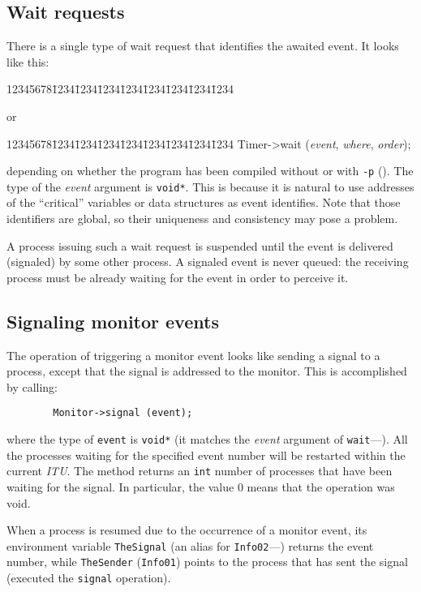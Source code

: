 \subsection{Wait requests}
\label{rm_mo_wr}

There is a single type of wait request that identifies the awaited event.
It looks like this:
{\tt\begin{tabbing}
12345678\=1234\=1234\=1234\=1234\=1234\=1234\=1234\=1234\kill
{}
\end{tabbing}}
\noindent
or
{\tt\begin{tabbing}
12345678\=1234\=1234\=1234\=1234\=1234\=1234\=1234\=1234\kill
\>Timer->wait ({\em event}, {\em where}, {\em order});
\end{tabbing}}
\noindent
depending on whether the program has been compiled without or with {\tt -p}
().
The type of the {\em event\/} argument is {\tt void*}.
This is because it is natural to use addresses of the ``critical'' variables
or data structures as event identifies.
Note that those identifiers are global, so their uniqueness and consistency
may pose a problem.

A process issuing such a wait request is suspended until the event is
delivered (signaled) by some other process.
A signaled event is never queued:
the receiving
process must be already waiting for the event in order to perceive it.

\subsection{Signaling monitor events}
\label{rm_mo_si}

The operation of triggering a monitor event looks like sending a signal to
a process, except that the signal is addressed to the monitor.
This is accomplished by calling:
\begin{verbatim}
        Monitor->signal (event);
\end{verbatim}
\noindent
where the type of {\tt event} is {\tt void*} (it matches the {\em event\/}
argument of {\tt wait}---).
All the processes waiting for the specified event number will be restarted
within the current {\em ITU\/}.
The method returns an {\tt int} number of processes that have been waiting
for the signal.
In particular, the value 0 means that the operation was void.

When a process is resumed due to the occurrence of a monitor event, its
environment variable {\tt TheSignal} (an alias for
{\tt Info02}---) returns the event number, while
{\tt TheSender} ({\tt Info01}) points to the process that has sent the
signal (executed the {\tt signal} operation).

